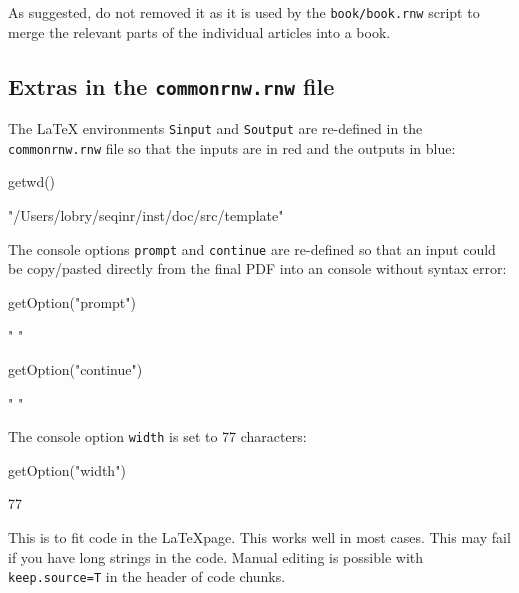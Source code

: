 \documentclass{article}
\begin{document}
As suggested, do not removed it as it is used by the \texttt{book/book.rnw}
script to merge the relevant parts of the individual articles into
a book.

\subsection{Extras in the \texttt{commonrnw.rnw} file}

The \LaTeX{} environments \texttt{Sinput} and \texttt{Soutput}
are re-defined in the \texttt{commonrnw.rnw} file so that the
\Rlogo{} inputs are in red and the \Rlogo{} outputs in blue:

\begin{Schunk}
\begin{Sinput}
 getwd()
\end{Sinput}
\begin{Soutput}
[1] "/Users/lobry/seqinr/inst/doc/src/template"
\end{Soutput}
\end{Schunk}

The \Rlogo{} console options \texttt{prompt} and \texttt{continue}
are re-defined so that an \Rlogo{} input could be copy/pasted
directly from the final PDF into an \Rlogo{} console without
syntax error:

\begin{Schunk}
\begin{Sinput}
 getOption("prompt")
\end{Sinput}
\begin{Soutput}
[1] " "
\end{Soutput}
\begin{Sinput}
 getOption("continue")
\end{Sinput}
\begin{Soutput}
[1] " "
\end{Soutput}
\end{Schunk}

The \Rlogo{} console option \texttt{width} is set to 77 characters:

\begin{Schunk}
\begin{Sinput}
 getOption("width")
\end{Sinput}
\begin{Soutput}
[1] 77
\end{Soutput}
\end{Schunk}

This is to fit \Rlogo{} code in the \LaTeX page. This works well
in most cases. This may fail if you have long strings in the code.
Manual editing is possible with \texttt{keep.source=T} in the header
of code chunks.
\end{document}
